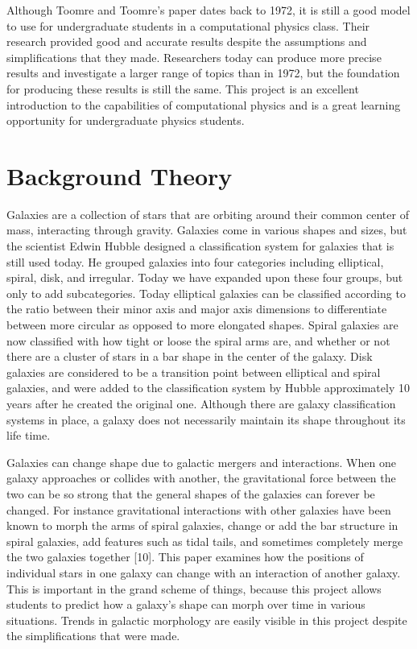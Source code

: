 \documentclass[11pt]{article}
\begin{document}
Although Toomre and Toomre's paper dates back to 1972, it is still a good model to use for undergraduate students in a computational physics class.  Their research provided good and accurate results despite the assumptions and simplifications that they made.  Researchers today can produce more precise results and investigate a larger range of topics than in 1972, but the foundation for producing these results is still the same.  This project is an excellent introduction to the capabilities of computational physics and is a great learning opportunity for undergraduate physics students.  

\section{Background Theory}

Galaxies are a collection of stars that are orbiting around their common center of mass, interacting through gravity.  Galaxies come in various shapes and sizes, but the scientist Edwin Hubble designed a classification system for galaxies that is still used today.  He grouped galaxies into four categories including elliptical, spiral, disk, and irregular.  Today we have expanded upon these four groups, but only to add subcategories.  Today elliptical galaxies can be classified according to the ratio between their minor axis and major axis dimensions to differentiate between more circular as opposed to more elongated shapes.  Spiral galaxies are now classified with how tight or loose the spiral arms are, and whether or not there are a cluster of stars in a bar shape in the center of the galaxy.  Disk galaxies are considered to be a transition point between elliptical and spiral galaxies, and were added to the classification system by Hubble approximately 10 years after he created the original one.   Although there are galaxy classification systems in place, a galaxy does not necessarily maintain its shape throughout its life time.

Galaxies can change shape due to galactic mergers and interactions.  When one galaxy approaches or collides with another, the gravitational force between the two can be so strong that the general shapes of the galaxies can forever be changed.  For instance gravitational interactions with other galaxies have been known to morph the arms of spiral galaxies, change or add the bar structure in spiral galaxies, add features such as tidal tails, and sometimes completely merge the two galaxies together [10].  This paper examines how the positions of individual stars in one galaxy can change with an interaction of another galaxy.  This is important in the grand scheme of things, because this project allows students to predict how a galaxy's shape can morph over time in various situations.  Trends in galactic morphology are easily visible in this project despite the simplifications that were made.
\end{document}
